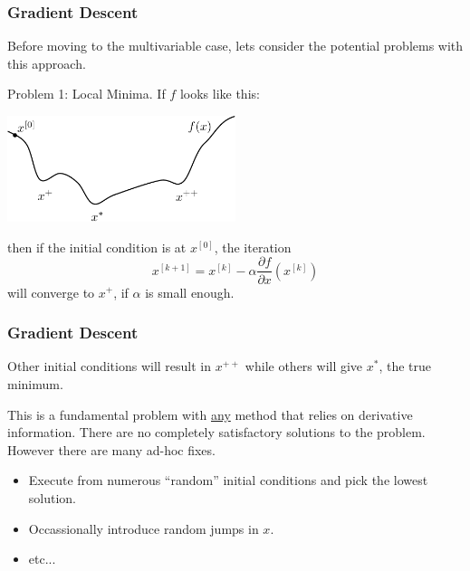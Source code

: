 \documentclass{beamer}
\begin{document}
\begin{frame}\frametitle{Gradient Descent}
	Before moving to the multivariable case, lets consider the potential problems with this approach.	
	
	\vfill
	
	{\color{blue}Problem 1: Local Minima.}
	If $f$ looks like this:
	\begin{center}
		\includegraphics[width=0.5\textwidth]
			{figures/chap14_function_gradiant_descent}
	\end{center}
	then if the initial condition is at $x^{[0]}$, the iteration 
	\[
		x^{[k+1]} = x^{[k]} - \alpha \frac{\partial f}{\partial x}(x^{[k]})
	\] 
	will converge to $x^+$, if $\alpha$ is small enough.
\end{frame}

\begin{frame}\frametitle{Gradient Descent}
	Other initial conditions will result in 
	$x^{++}$ while others will give $x^\ast$, the true minimum.
	
	\vfill
	
	This is a fundamental problem with \underline{any} method that relies on derivative information.  There are no completely satisfactory solutions to the problem.  However there are many ad-hoc fixes.	

	\vfill
	
	\begin{example}
		\begin{itemize}
		\item Execute from numerous ``random'' initial conditions and pick the lowest solution.
		\item Occassionally introduce random jumps in $x$.
		\item etc...
		\end{itemize}
	\end{example}
\end{frame}
\end{document}
